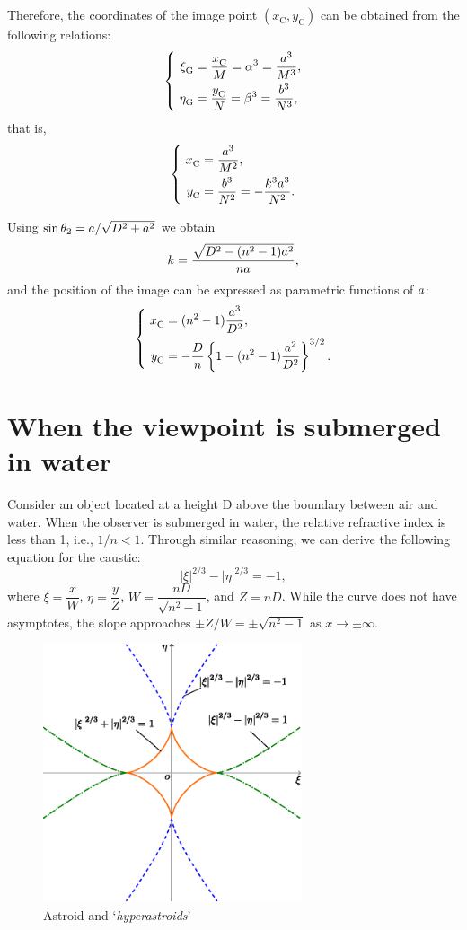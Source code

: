 \documentclass[twocolumn]{article}
\begin{document}
Therefore, the coordinates of the image point $(x_{\mathrm{C}}^{}, y_{\mathrm{C}}^{})$ can be obtained from the following relations:
$$ \left\{ 
\begin{aligned}
	\xi_{\mathrm{G}}^{} &= \dfrac{x_{\mathrm{C}}^{}}{M} = \greeka^3 = \dfrac{\romana^3}{M^3},\\
	\eta_{\mathrm{G}}^{} &= \dfrac{y_{\mathrm{C}}^{}}{N} = \greekb^3 = \dfrac{\romanb^3}{N^3},
\end{aligned}
\right.$$
that is,
$$\left\{ 
\begin{aligned}
	x_{\mathrm{C}}^{} &= \dfrac{\romana^3}{M^2},\\
	y_{\mathrm{C}}^{} &= \dfrac{\romanb^3}{N^2}=-\dfrac{k^3\romana^3}{N^2}.
\end{aligned}
\right.$$

Using 
$\sin\theta_2 = {{a}}/{\sqrt{D^2+{a}^2}}$
we obtain
$$k = \dfrac{\sqrt{D^2-(n^2-1){a}^2}}{n{a}},$$
and the position of the image can be expressed as parametric functions of ${a}$:
$$ \left\{ 
\begin{aligned}
	x_{\mathrm{C}}^{} &= (n^2-1)\dfrac{\romana^3}{D^2},\\
	y_{\mathrm{C}}^{} 
	&=-\dfrac{D}{n}\left\{ 1-(n^2-1)\dfrac{\romana^2}{D^2} \right\}^{3/2}.
\end{aligned}
\right.$$

\section{When the viewpoint is submerged in water}

Consider an object located at a height D above the boundary between air and water. When the observer is submerged in water, the relative refractive index is less than 1, i.e., $1/n < 1$. Through similar reasoning, we can derive the following equation for the caustic:
$$ \left| \xi \right|^{2/3} - \left| \eta \right|^{2/3} = -1, $$
where $\xi = \dfrac{x}{W} $, $\eta = \dfrac{y}{Z}$, $W = \dfrac{nD}{\sqrt{n^2-1}}$, and $Z = nD$. 
While the curve does not have asymptotes, the slope approaches $\pm Z/W = \pm \sqrt{n^2-1}$ as $x \to \pm\infty$.

\begin{figure}
	\centering
	\includegraphics[width=3in]{figs/g254.eps}
	\caption{Astroid and `\emph{hyperastroids}'}
	\label{fig:hyperastroid}
\end{figure}
\end{document}
